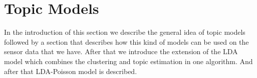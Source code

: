 \documentclass[11pt,a4paper]{article}
\begin{document}
% 

\pagebreak

\section{Topic Models}
\label{sec:TopicModels}
In the introduction of this section we describe the general idea of topic models followed by a section that describes how this kind of models can be used on the sensor data that we have. After that we introduce the extension of the LDA model which combines the clustering and topic estimation in one algorithm. And after that LDA-Poisson model is described.
\end{document}
